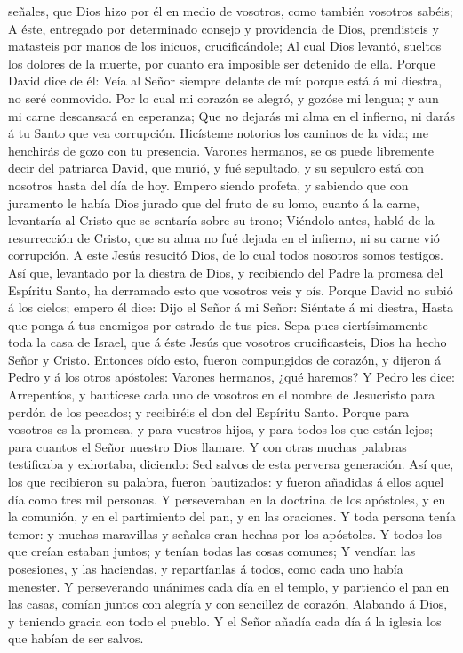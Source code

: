 señales, que Dios hizo por él en medio de vosotros, como también
vosotros sabéis;  A éste, entregado por determinado consejo
y providencia de Dios, prendisteis y matasteis por manos de los inicuos,
crucificándole;  Al cual Dios levantó, sueltos los dolores
de la muerte, por cuanto era imposible ser detenido de ella.
 Porque David dice de él: Veía al Señor siempre delante de
mí: porque está á mi diestra, no seré conmovido.  Por lo
cual mi corazón se alegró, y gozóse mi lengua; y aun mi carne descansará
en esperanza;  Que no dejarás mi alma en el infierno, ni
darás á tu Santo que vea corrupción.  Hicísteme notorios
los caminos de la vida; me henchirás de gozo con tu presencia.
 Varones hermanos, se os puede libremente decir del
patriarca David, que murió, y fué sepultado, y su sepulcro está con
nosotros hasta del día de hoy.  Empero siendo profeta, y
sabiendo que con juramento le había Dios jurado que del fruto de su
lomo, cuanto á la carne, levantaría al Cristo que se sentaría sobre su
trono;  Viéndolo antes, habló de la resurrección de Cristo,
que su alma no fué dejada en el infierno, ni su carne vió corrupción.
 A este Jesús resucitó Dios, de lo cual todos nosotros
somos testigos.  Así que, levantado por la diestra de Dios,
y recibiendo del Padre la promesa del Espíritu Santo, ha derramado esto
que vosotros veis y oís.  Porque David no subió á los
cielos; empero él dice: Dijo el Señor á mi Señor: Siéntate á mi diestra,
 Hasta que ponga á tus enemigos por estrado de tus pies.
 Sepa pues ciertísimamente toda la casa de Israel, que á
éste Jesús que vosotros crucificasteis, Dios ha hecho Señor y Cristo.
 Entonces oído esto, fueron compungidos de corazón, y
dijeron á Pedro y á los otros apóstoles: Varones hermanos, ¿qué haremos?
 Y Pedro les dice: Arrepentíos, y bautícese cada uno de
vosotros en el nombre de Jesucristo para perdón de los pecados; y
recibiréis el don del Espíritu Santo.  Porque para vosotros
es la promesa, y para vuestros hijos, y para todos los que están lejos;
para cuantos el Señor nuestro Dios llamare.  Y con otras
muchas palabras testificaba y exhortaba, diciendo: Sed salvos de esta
perversa generación.  Así que, los que recibieron su
palabra, fueron bautizados: y fueron añadidas á ellos aquel día como
tres mil personas.  Y perseveraban en la doctrina de los
apóstoles, y en la comunión, y en el partimiento del pan, y en las
oraciones.  Y toda persona tenía temor: y muchas maravillas
y señales eran hechas por los apóstoles.  Y todos los que
creían estaban juntos; y tenían todas las cosas comunes;  Y
vendían las posesiones, y las haciendas, y repartíanlas á todos, como
cada uno había menester.  Y perseverando unánimes cada día
en el templo, y partiendo el pan en las casas, comían juntos con alegría
y con sencillez de corazón,  Alabando á Dios, y teniendo
gracia con todo el pueblo. Y el Señor añadía cada día á la iglesia los
que habían de ser salvos.

